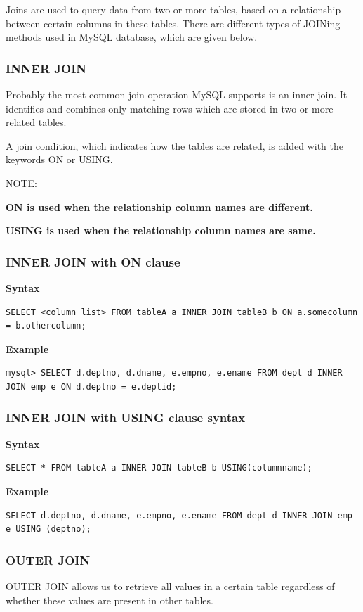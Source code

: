 \documentclass[11pt,a4paper]{article}
\begin{document}
\vspace{5in}

Joins are used to query data from two or more tables, based on a relationship between certain columns in these tables. There are different types of JOINing methods used in MySQL database, which are given below.

\subsubsection*{INNER JOIN} Probably the most common join operation MySQL supports is an inner join. It identifies and combines only matching rows which are stored in two or more related tables.

A join condition, which indicates how the tables are related, is added with the keywords ON or USING.

NOTE:

\textbf{ON is used when the relationship column names are different.}

\textbf{USING is used when the relationship column names are same.}
\subsubsection*{INNER JOIN with ON clause}
\textbf{Syntax}
\begin{verbatim}
SELECT <column list> FROM tableA a INNER JOIN tableB b ON a.somecolumn = b.othercolumn;
\end{verbatim}

\textbf{Example}
\begin{verbatim}
mysql> SELECT d.deptno, d.dname, e.empno, e.ename FROM dept d INNER JOIN emp e ON d.deptno = e.deptid;\end{verbatim}
\subsubsection*{INNER JOIN with USING clause syntax}
\textbf{Syntax}
\begin{verbatim}
SELECT * FROM tableA a INNER JOIN tableB b USING(columnname);\end{verbatim}

\textbf{Example}
\begin{verbatim}
SELECT d.deptno, d.dname, e.empno, e.ename FROM dept d INNER JOIN emp e USING (deptno);\end{verbatim}
\subsubsection*{OUTER JOIN} OUTER JOIN allows us to retrieve all values in a certain table regardless of whether these values are present in other tables.\\
\end{document}
